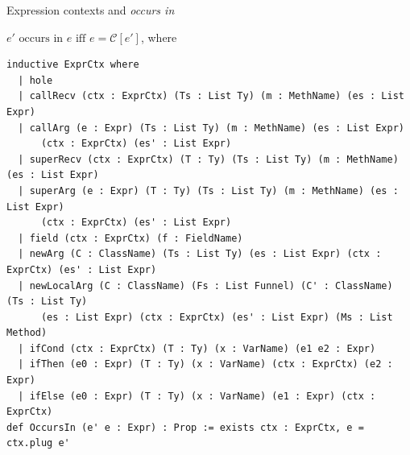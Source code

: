 \begin{cmp}{Expression contexts and \emph{occurs in}}
\begin{paperside}
$e'\textrm{ occurs in }e\textrm{ iff }e=\mathcal{C}[e']$, where\\[1ex]
\end{paperside}
\begin{leanside}
\begin{lstlisting}[style=leanside]
inductive ExprCtx where
  | hole
  | callRecv (ctx : ExprCtx) (Ts : List Ty) (m : MethName) (es : List Expr)
  | callArg (e : Expr) (Ts : List Ty) (m : MethName) (es : List Expr)
      (ctx : ExprCtx) (es' : List Expr)
  | superRecv (ctx : ExprCtx) (T : Ty) (Ts : List Ty) (m : MethName) (es : List Expr)
  | superArg (e : Expr) (T : Ty) (Ts : List Ty) (m : MethName) (es : List Expr)
      (ctx : ExprCtx) (es' : List Expr)
  | field (ctx : ExprCtx) (f : FieldName)
  | newArg (C : ClassName) (Ts : List Ty) (es : List Expr) (ctx : ExprCtx) (es' : List Expr)
  | newLocalArg (C : ClassName) (Fs : List Funnel) (C' : ClassName) (Ts : List Ty)
      (es : List Expr) (ctx : ExprCtx) (es' : List Expr) (Ms : List Method)
  | ifCond (ctx : ExprCtx) (T : Ty) (x : VarName) (e1 e2 : Expr)
  | ifThen (e0 : Expr) (T : Ty) (x : VarName) (ctx : ExprCtx) (e2 : Expr)
  | ifElse (e0 : Expr) (T : Ty) (x : VarName) (e1 : Expr) (ctx : ExprCtx)
def OccursIn (e' e : Expr) : Prop := exists ctx : ExprCtx, e = ctx.plug e'
\end{lstlisting}
\end{leanside}
\end{cmp}

